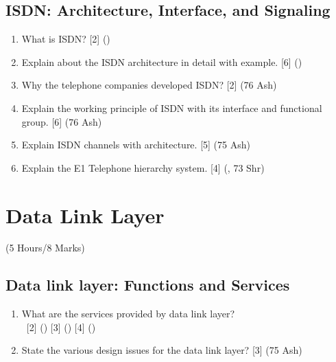 \documentclass[12pt]{article}
\newcommand{\enter}{\\\textcolor{white}{1}}
\begin{document}
	\subsection{ISDN: Architecture, Interface, and Signaling}
		\begin{enumerate}[noitemsep, topsep=0pt]
			\item What is ISDN? \hfill [2] ()
			
			\item Explain about the ISDN architecture in detail with example. \hfill [6] ()
			
			\item Why the telephone companies developed ISDN? \hfill [2] (76 Ash)
			
			\item Explain the working principle of ISDN with its interface and functional group. \hfill [6] (76 Ash)
			
			\item Explain ISDN channels with architecture. \hfill [5] (75 Ash)
			
			\item Explain the E1 Telephone hierarchy system. \hfill [4] (, 73 Shr)
		\end{enumerate}

	\pagebreak

\section{Data Link Layer}
	\begin{center}(5 Hours/8 Marks)\end{center}
	\subsection{Data link layer: Functions and Services}
		\begin{enumerate}[noitemsep, topsep=0pt]
			\item What are the services provided by data link layer?
			\enter\hfill [2] () [3] () [4] () 

			\item State the various design issues for the data link layer? \hfill [3] (75 Ash)
		\end{enumerate}
		
\end{document}
